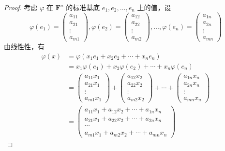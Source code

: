 \begin{proof}
    考虑 $\varphi$ 在 $\mathbf{F}^n$ 的标准基底 $e_1, e_2, \ldots, e_n$ 上的值，设
    \[
        \varphi(e_1) = \begin{pmatrix} a_{11} \\ a_{21} \\ \vdots \\ a_{m1} \end{pmatrix},
        \varphi(e_2) = \begin{pmatrix} a_{12} \\ a_{22} \\ \vdots \\ a_{m2} \end{pmatrix},
        \ldots,
        \varphi(e_n) = \begin{pmatrix} a_{1n} \\ a_{2n} \\ \vdots \\ a_{mn} \end{pmatrix}
    \]
    由线性性，有
    \begin{align*}
        \varphi(x) &= \varphi(x_1 e_1 + x_2 e_2 + \cdots + x_n e_n) \\
        &= x_1 \varphi(e_1) + x_2 \varphi(e_2) + \cdots + x_n \varphi(e_n) \\
        &= \begin{pmatrix} a_{11} x_1 \\ a_{21} x_1 \\ \vdots \\ a_{m1} x_1 \end{pmatrix} +
        \begin{pmatrix} a_{12} x_2 \\ a_{22} x_2 \\ \vdots \\ a_{m2} x_2 \end{pmatrix} +
        \cdots +
        \begin{pmatrix} a_{1n} x_n \\ a_{2n} x_n \\ \vdots \\ a_{mn} x_n \end{pmatrix}\\
        &= \begin{pmatrix}
            a_{11} x_1 + a_{12} x_2 + \cdots + a_{1n} x_n \\
            a_{21} x_1 + a_{22} x_2 + \cdots + a_{2n} x_n \\
            \cdots\\
            a_{m1} x_1 + a_{m2} x_2 + \cdots + a_{mn} x_n
        \end{pmatrix}
    \end{align*}
\end{proof}

